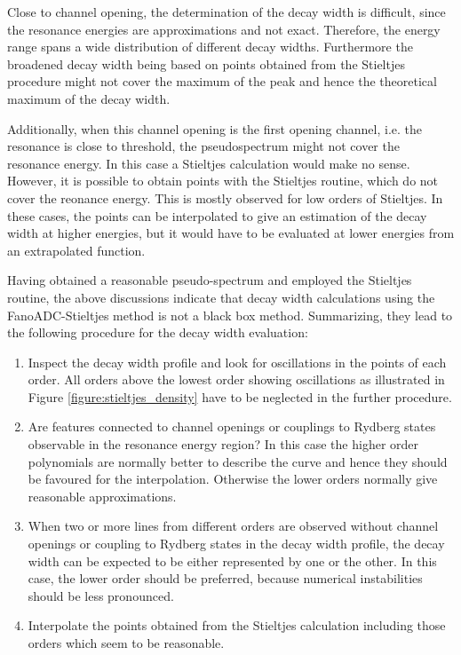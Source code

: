 Close to channel opening, the determination of the decay width is difficult, since
the resonance energies are approximations and not exact. Therefore, the
energy range spans a wide distribution of different decay widths. Furthermore
the broadened decay width being based on points obtained from the Stieltjes
procedure might not cover the maximum of the peak and hence the theoretical
maximum of the decay width.

Additionally, when this channel opening is the first opening channel, i.e. the
resonance is close to threshold, the pseudospectrum might not cover the resonance energy.
In this case a Stieltjes calculation would make no sense. However, it is possible
to obtain points with the Stieltjes routine, which do not cover the reonance energy.
This is mostly observed for low orders of Stieltjes. In these cases, the points
can be interpolated to give an estimation of the decay width at higher energies,
but it would have to be evaluated at lower energies from an extrapolated function.

Having obtained a reasonable pseudo-spectrum and employed the Stieltjes routine,
the above discussions indicate that decay width calculations using the FanoADC-Stieltjes
method is not a black box method. Summarizing, they lead to the
following procedure for the decay width evaluation:
\begin{enumerate}
 \item Inspect the decay width profile and look for oscillations in the
       points of each order. All orders above the lowest order showing oscillations as
       illustrated in Figure \ref{figure:stieltjes_density}
       have to be neglected in the further
       procedure.
 \item Are features connected to channel openings or couplings to Rydberg states
       observable in the resonance energy region? In this case the higher
       order polynomials are normally better to describe the curve and hence they
       should be favoured for the interpolation. Otherwise the lower orders
       normally give reasonable approximations.
 \item When two or more lines from different orders are observed without channel
       openings or coupling to Rydberg states in the decay width profile,
       the decay width can be expected to be either represented by one or the
       other. In this case, the lower order should be preferred, because
       numerical instabilities should be less pronounced.
 \item Interpolate the points obtained from the Stieltjes calculation including
       those orders which seem to be
       reasonable.
\end{enumerate}
